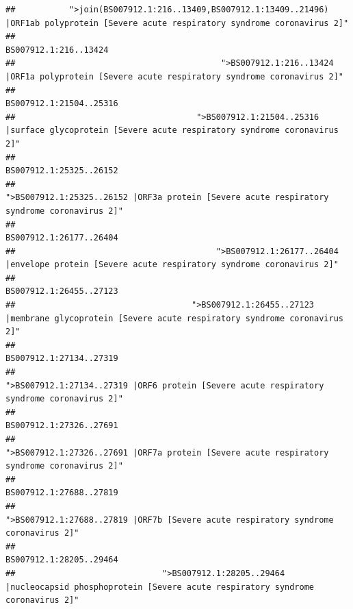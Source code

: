 \documentclass[
]{article}
\begin{document}
\begin{verbatim}
##           ">join(BS007912.1:216..13409,BS007912.1:13409..21496) |ORF1ab polyprotein [Severe acute respiratory syndrome coronavirus 2]" 
##                                                                                                                  BS007912.1:216..13424 
##                                          ">BS007912.1:216..13424 |ORF1a polyprotein [Severe acute respiratory syndrome coronavirus 2]" 
##                                                                                                                BS007912.1:21504..25316 
##                                     ">BS007912.1:21504..25316 |surface glycoprotein [Severe acute respiratory syndrome coronavirus 2]" 
##                                                                                                                BS007912.1:25325..26152 
##                                            ">BS007912.1:25325..26152 |ORF3a protein [Severe acute respiratory syndrome coronavirus 2]" 
##                                                                                                                BS007912.1:26177..26404 
##                                         ">BS007912.1:26177..26404 |envelope protein [Severe acute respiratory syndrome coronavirus 2]" 
##                                                                                                                BS007912.1:26455..27123 
##                                    ">BS007912.1:26455..27123 |membrane glycoprotein [Severe acute respiratory syndrome coronavirus 2]" 
##                                                                                                                BS007912.1:27134..27319 
##                                             ">BS007912.1:27134..27319 |ORF6 protein [Severe acute respiratory syndrome coronavirus 2]" 
##                                                                                                                BS007912.1:27326..27691 
##                                            ">BS007912.1:27326..27691 |ORF7a protein [Severe acute respiratory syndrome coronavirus 2]" 
##                                                                                                                BS007912.1:27688..27819 
##                                                    ">BS007912.1:27688..27819 |ORF7b [Severe acute respiratory syndrome coronavirus 2]" 
##                                                                                                                BS007912.1:28205..29464 
##                              ">BS007912.1:28205..29464 |nucleocapsid phosphoprotein [Severe acute respiratory syndrome coronavirus 2]" 

\end{verbatim}
\end{document}

